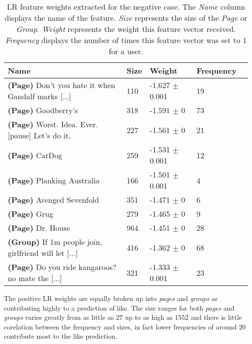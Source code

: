 \begin{table}[h]
\begin{minipage}[b]{1.0\textwidth}
\centering
  \begin{tabular}{|l|l|l|l|l|} %
  \hline
  \textbf{Name} & \textbf{Size} & \textbf{Weight} & \textbf{Frequency} \\ \hline

\small{\textbf{(Page)} Don't you hate it when Gandalf marks [...] } & 110 & -1.627 $\pm$ 0.001 & 19 \\ \hline
\small{\textbf{(Page)} Goodberry's } & 318 & -1.591 $\pm$ 0 & 73 \\ \hline
\small{\textbf{(Page)} Worst. Idea. Ever. [pause] Let's do it. } & 227 & -1.561 $\pm$ 0 & 21 \\ \hline
\small{\textbf{(Page)} CatDog } & 259 & -1.531 $\pm$ 0.001 & 12 \\ \hline
\small{\textbf{(Page)} Planking Australia } & 166 & -1.501 $\pm$ 0.001 & 4 \\ \hline
\small{\textbf{(Page)} Avenged Sevenfold } & 351 & -1.471 $\pm$ 0 & 6 \\ \hline
\small{\textbf{(Page)} Grug } & 279 & -1.465 $\pm$ 0 & 9 \\ \hline
\small{\textbf{(Page)} Dr. House } & 964 & -1.451 $\pm$ 0 & 28 \\ \hline
\small{\textbf{(Group)} If 1m people join, girlfriend will let [...] } & 416 & -1.362 $\pm$ 0 & 68 \\ \hline
\small{\textbf{(Page)} Do you ride kangaroos? no mate the [...] } & 321 & -1.333 $\pm$ 0.001 & 23 \\ \hline
  \end{tabular}
  \caption{LR feature weights extracted for the negative case. The \emph{Name} column displays the name of the feature.
                        \emph{Size} represents the size of the \emph{Page} or \emph{Group}.
                        \emph{Weight} represents the weight this feature vector received.  
                        \emph{Frequency} displays the number of times this feature vector was set to $1$ for a user.}
\end{minipage}
\end{table}

The positive LR weights are equally broken up into \emph{pages} and \emph{groups} as contributing highly to a prediction of like. The size ranges 
for both \emph{pages} and \emph{groups} varies greatly from as little as $27$ up to as high as $1552$ and there is little corelation between 
the frequency and sizes, in fact lower frequencies of around $20$ contribute most to the like prediction.

